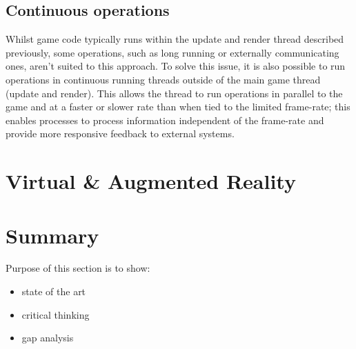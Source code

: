 \subsection{Continuous operations}
\label{subs:Continuous operations}
Whilst game code typically runs within the update and render thread described previously, some operations, such as long running or externally communicating ones, aren't suited to this approach. To solve this issue, it is also possible to run operations in continuous running threads outside of the main game thread (update and render). This allows the thread to run operations in parallel to the game and at a faster or slower rate than when tied to the limited frame-rate; this enables processes to process information independent of the frame-rate and provide more responsive feedback to external systems.


\section{Virtual \& Augmented Reality} %
\label{sec:virtual_reality_&_ar}

\section{Summary} %
\label{sec:summary}
Purpose of this section is to show:
\begin{itemize}
  \item state of the art
  \item critical thinking
  \item gap analysis
\end{itemize}
